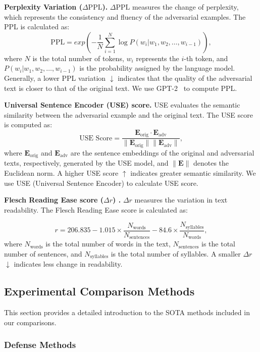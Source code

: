 \noindent\textbf{Perplexity Variation ($\Delta\mathrm{PPL}$).} $\Delta\mathrm{PPL}$ measures the change of perplexity, which represents the consistency and fluency of the adversarial examples.
The PPL is calculated as:
\[
\mathrm{PPL} = exp(-\frac{1}{N} \sum_{i=1}^{N} \log P(w_i | w_1, w_2, \dots, w_{i-1})),
\]
where \(N\) is the total number of tokens, \(w_i\) represents the \(i\)-th token, and \(P(w_i | w_1, w_2, \dots, w_{i-1})\) is the probability assigned by the language model. Generally, a lower PPL variation $\downarrow$ indicates that the quality of the adversarial text is closer to that of the original text. We use GPT-2~\cite{radford2019language} to compute PPL.

\noindent\textbf{Universal Sentence Encoder (USE) score\cite{cer2018universal}. }
USE evaluates the semantic similarity between the adversarial example and the original text.
The USE score is computed as:
\[
\text{USE Score} = \frac{\mathbf{E}_{\text{orig}} \cdot \mathbf{E}_{\text{adv}}}{\|\mathbf{E}_{\text{orig}}\| \|\mathbf{E}_{\text{adv}}\|},
\]
where \( \mathbf{E}_{\text{orig}} \) and \( \mathbf{E}_{\text{adv}} \) are the sentence embeddings of the original and adversarial texts, respectively, generated by the USE model, and \( \|\mathbf{E}\| \) denotes the Euclidean norm. A higher USE score $\uparrow$ indicates greater semantic similarity. We use USE (Universal Sentence Encoder) to calculate USE score.

\noindent\textbf{Flesch Reading Ease score (\(\Delta r\)) \cite{flesch1948new}.}
$\Delta r$ measures the variation in text readability. The Flesch Reading Ease score is calculated as:

\[
r = 206.835 - 1.015 \times \frac{N_{\text{words}}}{N_{\text{sentences}}} - 84.6 \times \frac{N_{\text{syllables}}}{N_{\text{words}}},
\]
where \( N_{\text{words}} \) is the total number of words in the text, \( N_{\text{sentences}} \) is the total number of sentences, and \( N_{\text{syllables}} \) is the total number of syllables. A smaller \( \Delta r \) $\downarrow$ indicates less change in readability.

\subsection{Experimental Comparison Methods}
This section provides a detailed introduction to the SOTA methods included in our comparisons.

\subsubsection{Defense Methods}
\label{apdx:defmethod}



